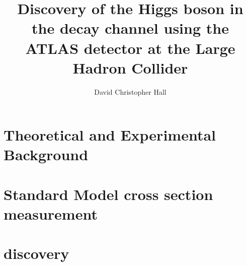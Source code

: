 \documentclass[sftitles]{hepthesis}
\title{Discovery of the Higgs boson in the \HepProcess{\PW\PW} decay channel using the ATLAS detector at the Large Hadron Collider}
\author{David Christopher Hall}
\begin{document}
\begin{frontmatter}
  
\end{frontmatter}

\begin{mainmatter}
  
  \part{Theoretical and Experimental Background}
  
  
  

  \part{Standard Model \HepProcess{\PW\PW} cross section measurement}

  \part{\HtoWW discovery}

\end{mainmatter}

\begin{appendices}

\end{appendices}

\begin{backmatter}
  
  
  \listoffigures
  \listoftables
\end{backmatter}
\end{document}
